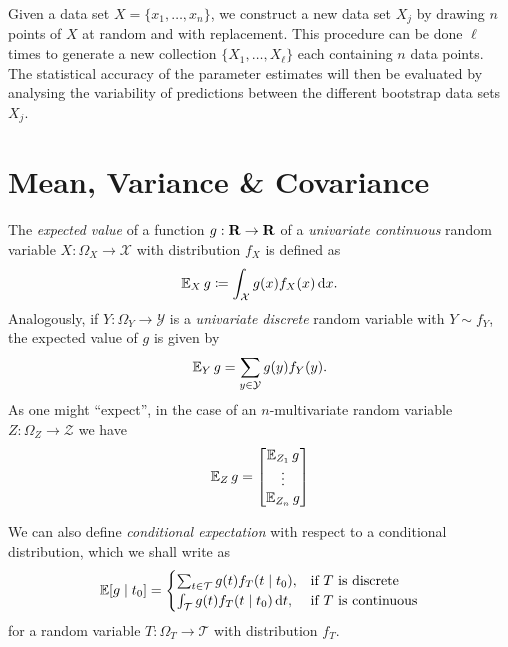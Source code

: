 \begin{definition}
\label{def:bootstrap-data-sets}
Given a data set \(X = \{x_1, \dots, x_n\}\), we construct a new data set
\(X_j\) by drawing \(n\) points of \(X\) at random and with replacement. This
procedure can be done \(\ell\) times to generate a new collection \(\{X_1,
\dots, X_{\ell}\}\) each containing \(n\) data points. The statistical accuracy
of the parameter estimates will then be evaluated by analysing the variability
of predictions between the different bootstrap data sets \(X_j\).
\end{definition}

\section{Mean, Variance \& Covariance}

\begin{definition}
\label{def:expected-value}
The \emph{expected value} of a function \(g: \mathbf{R} \to \mathbf{R}\) of a \emph{univariate
continuous} random variable \(X: \Omega_X \to \mathcal{X}\) with distribution \(f_X\)
is defined as
\[
\operatorname{\mathbb{E}}_X g \coloneq \int_{\mathcal{X}} g(x) f_X(x)\, \mathrm{d} x.
\]
Analogously, if \(Y: \Omega_Y \to \mathcal{Y}\) is a \emph{univariate discrete}
random variable with \(Y \sim f_Y\), the expected value of \(g\) is given by
\[
\operatorname{\mathbb{E}}_Y g = \sum_{y \in \mathcal{Y}} g(y) f_Y(y).
\]
As one might ``expect'', in the case of an \(n\)-multivariate random variable
\(Z: \Omega_Z \to \mathcal{Z}\) we have
\[
\operatorname{\mathbb{E}}_Z g =
\begin{bmatrix}
  \operatorname{\mathbb{E}}_{Z_1} g \\
  \vdots \\
  \operatorname{\mathbb{E}}_{Z_n} g
\end{bmatrix}
\]

We can also define \emph{conditional expectation} with respect to a conditional
distribution, which we shall write as
\[
\operatorname{\mathbb{E}}[g \mid t_0] =
\begin{cases}
  \sum_{t \in \mathcal{T}} g(t) f_T(t \mid t_0), &\text{if } T \text{ is discrete}\\
  \int_{\mathcal{T}} g(t) f_T(t \mid t_0)\, \mathrm{d} t, &\text{if } T \text{ is continuous}
\end{cases}
\]
for a random variable \(T: \Omega_T \to \mathcal{T}\) with distribution \(f_T\).
\end{definition}

